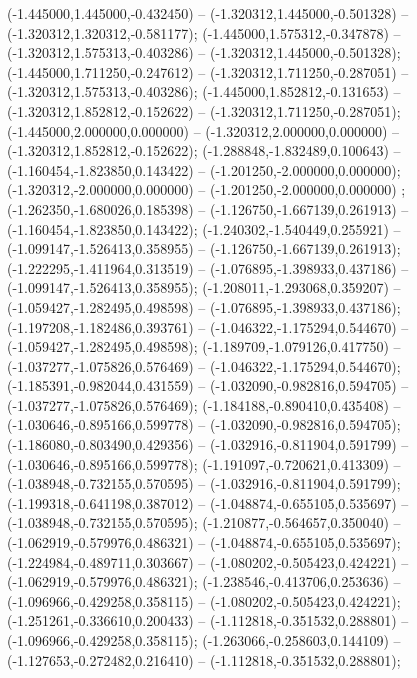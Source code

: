  (-1.445000,1.445000,-0.432450) -- (-1.320312,1.445000,-0.501328) -- (-1.320312,1.320312,-0.581177);
 (-1.445000,1.575312,-0.347878) -- (-1.320312,1.575313,-0.403286) -- (-1.320312,1.445000,-0.501328);
 (-1.445000,1.711250,-0.247612) -- (-1.320312,1.711250,-0.287051) -- (-1.320312,1.575313,-0.403286);
 (-1.445000,1.852812,-0.131653) -- (-1.320312,1.852812,-0.152622) -- (-1.320312,1.711250,-0.287051);
 (-1.445000,2.000000,0.000000) -- (-1.320312,2.000000,0.000000) -- (-1.320312,1.852812,-0.152622);
 (-1.288848,-1.832489,0.100643) -- (-1.160454,-1.823850,0.143422) -- (-1.201250,-2.000000,0.000000);
 (-1.320312,-2.000000,0.000000) -- (-1.201250,-2.000000,0.000000) ;
 (-1.262350,-1.680026,0.185398) -- (-1.126750,-1.667139,0.261913) -- (-1.160454,-1.823850,0.143422);
 (-1.240302,-1.540449,0.255921) -- (-1.099147,-1.526413,0.358955) -- (-1.126750,-1.667139,0.261913);
 (-1.222295,-1.411964,0.313519) -- (-1.076895,-1.398933,0.437186) -- (-1.099147,-1.526413,0.358955);
 (-1.208011,-1.293068,0.359207) -- (-1.059427,-1.282495,0.498598) -- (-1.076895,-1.398933,0.437186);
 (-1.197208,-1.182486,0.393761) -- (-1.046322,-1.175294,0.544670) -- (-1.059427,-1.282495,0.498598);
 (-1.189709,-1.079126,0.417750) -- (-1.037277,-1.075826,0.576469) -- (-1.046322,-1.175294,0.544670);
 (-1.185391,-0.982044,0.431559) -- (-1.032090,-0.982816,0.594705) -- (-1.037277,-1.075826,0.576469);
 (-1.184188,-0.890410,0.435408) -- (-1.030646,-0.895166,0.599778) -- (-1.032090,-0.982816,0.594705);
 (-1.186080,-0.803490,0.429356) -- (-1.032916,-0.811904,0.591799) -- (-1.030646,-0.895166,0.599778);
 (-1.191097,-0.720621,0.413309) -- (-1.038948,-0.732155,0.570595) -- (-1.032916,-0.811904,0.591799);
 (-1.199318,-0.641198,0.387012) -- (-1.048874,-0.655105,0.535697) -- (-1.038948,-0.732155,0.570595);
 (-1.210877,-0.564657,0.350040) -- (-1.062919,-0.579976,0.486321) -- (-1.048874,-0.655105,0.535697);
 (-1.224984,-0.489711,0.303667) -- (-1.080202,-0.505423,0.424221) -- (-1.062919,-0.579976,0.486321);
 (-1.238546,-0.413706,0.253636) -- (-1.096966,-0.429258,0.358115) -- (-1.080202,-0.505423,0.424221);
 (-1.251261,-0.336610,0.200433) -- (-1.112818,-0.351532,0.288801) -- (-1.096966,-0.429258,0.358115);
 (-1.263066,-0.258603,0.144109) -- (-1.127653,-0.272482,0.216410) -- (-1.112818,-0.351532,0.288801);
